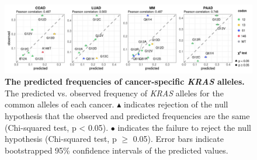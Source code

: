 \documentclass[english, 10pt, letterpaper]{article}
\newcommand{\KRAS}{\emph{KRAS}}
\begin{document}
\begin{figure}[h!]
\centering
\includegraphics[width=176mm]{figures/Fig_2.jpeg}
\caption{
    \textbf{The predicted frequencies of cancer-specific \KRAS{} alleles.}
    The predicted vs. observed frequency of \KRAS{} alleles for the common alleles of each cancer. $\blacktriangle$ indicates rejection of the null hypothesis that the observed and predicted frequencies are the same (Chi-squared test, p < 0.05). $\bullet$ indicates the failure to reject the null hypothesis (Chi-squared test, p $\ge$ 0.05). Error bars indicate bootstrapped 95\% confidence intervals of the predicted values.
}
\label{fig:obs-vs-pred-main}
\end{figure}
\newpage
\end{document}
